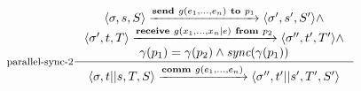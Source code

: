 \documentclass[parskip]{scrartcl}
\newcommand{\step}[1]{\xrightarrow{#1}}
\newcommand{\sync}{\textit{sync}}
\theoremstyle{definition}
\begin{document}
$\inference[parallel-sync-2]{\langle \sigma, s, S \rangle \step{\textbf{send}\ g(e_1,\ldots, e_n)\ \textbf{to}\ p_1} \langle \sigma', s', S' \rangle \wedge\\
\langle \sigma', t, T\rangle \step{\textbf{receive}\ g(x_1,\ldots,x_n \mid e)\ \textbf{from}\ p_2} \langle \sigma'', t',T'\rangle \wedge\\
\gamma(p_1) = \gamma(p_2) \wedge \sync(\gamma(p_1))}{\langle \sigma, t||s, T, S \rangle \step{\textbf{comm}\ g(e_1,\ldots,e_n)} \langle \sigma'',t'||s',T',S' \rangle}$
\end{document}

